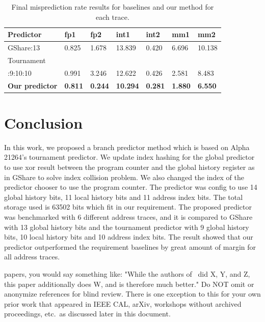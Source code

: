 \documentclass[conference]{IEEEtran}
\begin{document}
\begin{scriptsize}
\begin{table}[h!]
  \centering
  \caption{Final misprediction rate results for baselines and our method for each trace.}
  \label{table:result}
  \begin{tabular}{|l|l|l|l|l|l|l|}
    \hline
    \textbf{Predictor} & \textbf{fp1} & \textbf{fp2} & \textbf{int1} &\textbf{int2} & \textbf{mm1} & \textbf{mm2}\\
    \hline
    \hline
    GShare:13 & 0.825 & 1.678 & 13.839 & 0.420 & 6.696 & 10.138 \\
    \hline
    Tournament & & & & & & \\
    :9:10:10 & 0.991 & 3.246 & 12.622 & 0.426 & 2.581 & 8.483 \\
    \hline
    \hline
    \textbf{Our predictor} & \textbf{0.811} & \textbf{0.244} & \textbf{10.294} & \textbf{0.281} & \textbf{1.880} & \textbf{6.550} \\
    \hline
  \end{tabular}
\end{table}
\end{scriptsize}

\section{Conclusion}

In this work, we proposed a branch predictor method which is based on Alpha 21264's tournament predictor.
We update index hashing for the global predictor to use xor result between the program counter and the global
history register as in GShare to solve index collision problem. We also changed the index of the predictor chooser
to use the program counter. The predictor was config to use 14 global history bits,
11 local history bits and 11 address index bits. The total storage used is 63502 bits which fit in our requirement.
The proposed predictor was benchmarked with 6 different address traces, and it is compared to
GShare with 13 global history bits and the tournament predictor with 9 global history bits, 10 local history bits
and 10 address index bits. The result showed that our predictor outperformed the requirement baselines
by great amount of margin for all address traces.


papers\cite{nicepaper1,nicepaper2,nicepaper3}, you would say
something like: "While the authors of~\cite{nicepaper1,nicepaper2,nicepaper3} did X,
Y, and Z, this paper additionally does W, and is therefore much
better."  Do NOT omit or anonymize references for blind review.  There
is one exception to this for your own prior work that appeared in IEEE
CAL, arXiv, workshops without archived proceedings, etc.\ as
discussed later in this document. 
\end{document}
